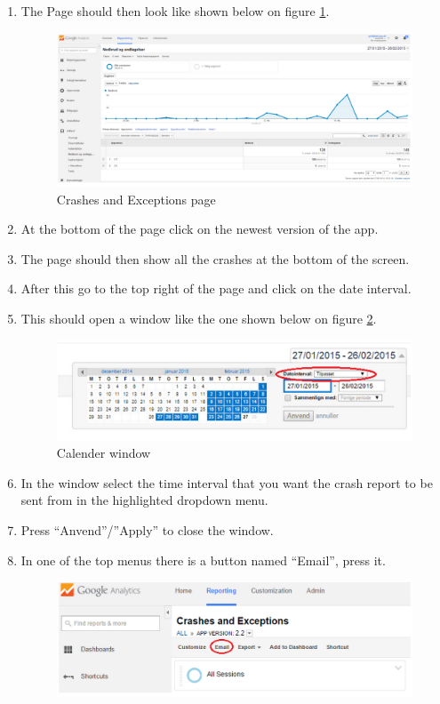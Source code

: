 \begin{enumerate}
	\item The Page should then look like shown below on figure \ref{CrashesAndExceptions}.
		\begin{figure}[H]
			\includegraphics[width=0.8 \textwidth]{pictures/CrashesAndExceptions.png}
			\caption{Crashes and Exceptions page}
			\label{CrashesAndExceptions}
		\end{figure}	
	\item At the bottom of the page click on the newest version of the app.
	\item The page should then show all the crashes at the bottom of the screen.
	\item After this go to the top right of the page and click on the date interval.
	\item This should open a window like the one shown below on figure \ref{Calender}.
		\begin{figure}[H]
			\includegraphics[width=0.8 \textwidth]{pictures/Calender.png}
			\caption{Calender window}
			\label{Calender}
		\end{figure}
	\item In the window select the time interval that you want the crash report to be sent from in the highlighted dropdown menu.
	\item Press “Anvend”/”Apply” to close the window.
	\item In one of the top menus there is a button named “Email”, press it.
		\begin{figure}[H]
			\includegraphics[width=0.8 \textwidth]{pictures/Email.png}

\end{figure}
\end{enumerate}
